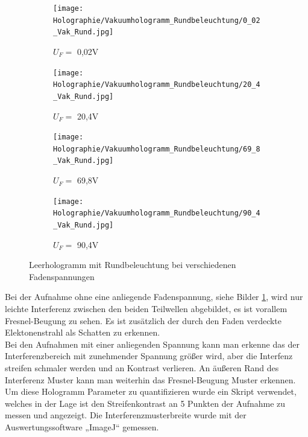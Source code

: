 \begin{figure}[H]
     \centering
     \begin{subfigure}[b]{0.49\textwidth}
         \centering
         \texttt{[image: Holographie/Vakuumhologramm\_Rundbeleuchtung/0\_02\_Vak\_Rund.jpg]}
         \caption{\(U_F =\) 0,02V}
         \label{002VakRund}
     \end{subfigure}
     \hfill
     \begin{subfigure}[b]{0.49\textwidth}
         \centering
         \texttt{[image: Holographie/Vakuumhologramm\_Rundbeleuchtung/20\_4\_Vak\_Rund.jpg]}
         \caption{\(U_F =\) 20,4V}
         \label{204VakRund}
     \end{subfigure}
      

 \centering
     \begin{subfigure}[b]{0.49\textwidth}
         \centering
         \texttt{[image: Holographie/Vakuumhologramm\_Rundbeleuchtung/69\_8\_Vak\_Rund.jpg]}
         \caption{\(U_F =\) 69,8V}
         \label{698VakRund}
     \end{subfigure}
     \hfill
     \begin{subfigure}[b]{0.49\textwidth}
         \centering
         \texttt{[image: Holographie/Vakuumhologramm\_Rundbeleuchtung/90\_4\_Vak\_Rund.jpg]}
         \caption{\(U_F =\) 90,4V}
         \label{904VakRund}
     \end{subfigure}
     \caption{Leerhologramm mit Rundbeleuchtung bei verschiedenen Fadenspannungen}
        \label{VakHolRund}
 
\end{figure}

Bei der Aufnahme ohne eine anliegende Fadenspannung, siehe Bilder \cref{002VakRund}, wird nur leichte Interferenz zwischen den beiden Teilwellen abgebildet, es ist vorallem   Fresnel-Beugung zu sehen. Es ist zusätzlich der durch den Faden verdeckte Elektonenstrahl als Schatten zu erkennen.\\
Bei den Aufnahmen mit einer anliegenden Spannung kann man erkenne das der Interferenzbereich mit zunehmender Spannung größer wird, aber die Interfenz streifen schmaler werden und an Kontrast verlieren. An äußeren Rand des Interferenz Muster kann man weiterhin das Fresnel-Beugung Muster erkennen. \\
Um diese Hologramm Parameter zu quantifizieren wurde ein Skript verwendet, welches in der Lage ist den Streifenkontrast an 5 Punkten der Aufnahme zu messen und angezeigt. Die Interferenzmusterbreite wurde mit der Auswertungssoftware „ImageJ“ gemessen. 

